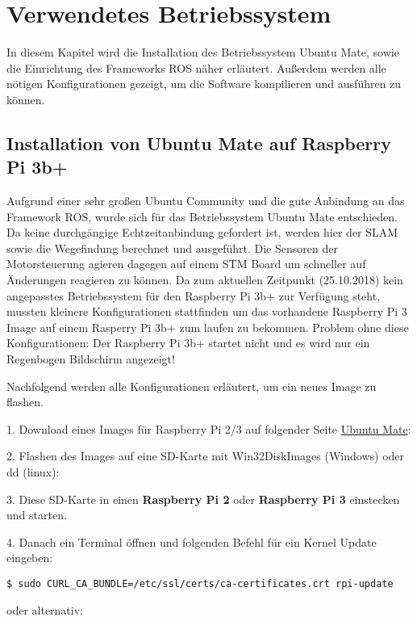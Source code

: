\chapter{Verwendetes Betriebssystem}
In diesem Kapitel wird die Installation des Betriebssystem Ubuntu Mate, sowie die Einrichtung des Frameworks ROS näher erläutert. Außerdem werden alle nötigen Konfigurationen gezeigt, um die Software kompilieren und ausführen zu können. 


\section{Installation von Ubuntu Mate auf Raspberry Pi 3b+}
Aufgrund einer sehr großen Ubuntu Community und die gute Anbindung an das Framework ROS, wurde sich für das Betriebssystem Ubuntu Mate entschieden. Da keine durchgängige Echtzeitanbindung gefordert ist, werden hier der SLAM sowie die Wegefindung berechnet und ausgeführt. Die Sensoren der Motorsteuerung agieren dagegen auf einem STM Board um schneller auf Änderungen reagieren zu können. 
Da zum aktuellen Zeitpunkt (25.10.2018) kein angepasstes Betriebssystem für den Raspberry Pi 3b+ zur Verfügung steht, mussten kleinere Konfigurationen stattfinden um das vorhandene Raspberry Pi 3 Image auf einem Rasperry Pi 3b+ zum laufen zu bekommen. 
Problem ohne diese Konfigurationen: Der Raspberry Pi 3b+ startet nicht und es wird nur ein Regenbogen Bildschirm angezeigt!

Nachfolgend werden alle Konfigurationen erläutert, um ein neues Image zu flashen. 

1. Download eines Images für Raspberry  Pi 2/3 auf folgender Seite \href{https://ubuntu-mate.org/download/}{Ubuntu Mate}:

2. Flashen des Images auf eine SD-Karte mit Win32DiskImages (Windows) oder dd (linux):

3. Diese SD-Karte in einen \textbf{Raspberry Pi 2} oder \textbf{Raspberry Pi 3} einstecken und starten. 

4. Danach ein Terminal öffnen und folgenden Befehl für ein Kernel Update eingeben:\\

\begin{lstlisting}
$ sudo CURL_CA_BUNDLE=/etc/ssl/certs/ca-certificates.crt rpi-update
\end{lstlisting}
\vspace{-0.8cm}

oder alternativ:\\

